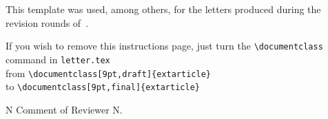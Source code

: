 %
This template was used, among others, for the letters produced during the revision rounds of~\cite{Cecconi.etal/IS2024:MeasuringRuleBasedLTLfSpecifications}.
\begin{NoteForAuthors}
	If you wish to remove this instructions page, just turn the \verb|\documentclass| command in \texttt{letter.tex}
	\\
	from \verb|\documentclass[9pt,draft]{extarticle}|
	\\
	to \verb|\documentclass[9pt,final]{extarticle}|
\end{NoteForAuthors}
\bigskip

\begin{ReviewerComment}[\label{memo:example:comment}]{N}
Comment of Reviewer N.
\end{ReviewerComment}
%
